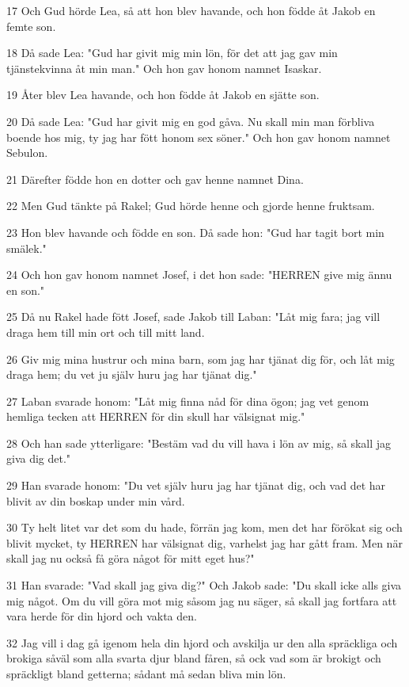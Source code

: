 \par 17 Och Gud hörde Lea, så att hon blev havande, och hon födde åt Jakob en femte son.
\par 18 Då sade Lea: "Gud har givit mig min lön, för det att jag gav min tjänstekvinna åt min man." Och hon gav honom namnet Isaskar.
\par 19 Åter blev Lea havande, och hon födde åt Jakob en sjätte son.
\par 20 Då sade Lea: "Gud har givit mig en god gåva. Nu skall min man förbliva boende hos mig, ty jag har fött honom sex söner." Och hon gav honom namnet Sebulon.
\par 21 Därefter födde hon en dotter och gav henne namnet Dina.
\par 22 Men Gud tänkte på Rakel; Gud hörde henne och gjorde henne fruktsam.
\par 23 Hon blev havande och födde en son. Då sade hon: "Gud har tagit bort min smälek."
\par 24 Och hon gav honom namnet Josef, i det hon sade: "HERREN give mig ännu en son."
\par 25 Då nu Rakel hade fött Josef, sade Jakob till Laban: "Låt mig fara; jag vill draga hem till min ort och till mitt land.
\par 26 Giv mig mina hustrur och mina barn, som jag har tjänat dig för, och låt mig draga hem; du vet ju själv huru jag har tjänat dig."
\par 27 Laban svarade honom: "Låt mig finna nåd för dina ögon; jag vet genom hemliga tecken att HERREN för din skull har välsignat mig."
\par 28 Och han sade ytterligare: "Bestäm vad du vill hava i lön av mig, så skall jag giva dig det."
\par 29 Han svarade honom: "Du vet själv huru jag har tjänat dig, och vad det har blivit av din boskap under min vård.
\par 30 Ty helt litet var det som du hade, förrän jag kom, men det har förökat sig och blivit mycket, ty HERREN har välsignat dig, varhelst jag har gått fram. Men när skall jag nu också få göra något för mitt eget hus?"
\par 31 Han svarade: "Vad skall jag giva dig?" Och Jakob sade: "Du skall icke alls giva mig något. Om du vill göra mot mig såsom jag nu säger, så skall jag fortfara att vara herde för din hjord och vakta den.
\par 32 Jag vill i dag gå igenom hela din hjord och avskilja ur den alla spräckliga och brokiga såväl som alla svarta djur bland fåren, så ock vad som är brokigt och spräckligt bland getterna; sådant må sedan bliva min lön.
